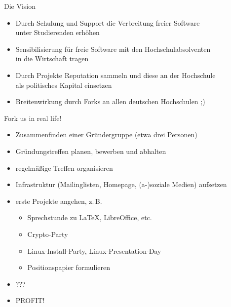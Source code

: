 \documentclass{beamer}
\begin{document}
\begin{frame}{Die Vision}
  \begin{itemize}
  \item<1-> Durch Schulung und Support die Verbreitung freier Software \\
    unter Studierenden erhöhen
  \item<2-> Sensibilisierung für freie Software mit den Hochschulabsolventen  \\
    in die Wirtschaft tragen
  \item<3-> Durch Projekte Reputation sammeln und diese an der Hochschule \\
    als politisches Kapital einsetzen
  \item<4-> Breitenwirkung durch Forks an allen deutschen Hochschulen ;)
  \end{itemize}
\end{frame}

\begin{frame}{Fork us in real life!}
  \begin{itemize}
  \item<1-> Zusammenfinden einer Gründergruppe (etwa drei Personen)
  \item<2-> Gründungstreffen planen, bewerben und abhalten
  \item<3-> regelmäßige Treffen organisieren
  \item<4-> Infrastruktur (Mailinglisten, Homepage, (a-)soziale Medien) aufsetzen
  \item<5-> erste Projekte angehen, z.\,B.
    \begin{itemize}
    \item Sprechstunde zu LaTeX, LibreOffice, etc.
    \item Crypto-Party
    \item Linux-Install-Party, Linux-Presentation-Day
    \item Positionspapier formulieren
    \end{itemize}
  \item<6-> ???
  \item<7-> PROFIT!
  \end{itemize}
\end{frame}
\end{document}
